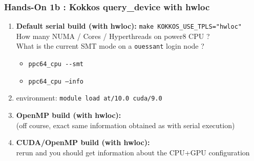 \begin{frame}[fragile=singleslide]
  \frametitle{Hands-On 1b : Kokkos query\_device with hwloc}

  \begin{enumerate}
  \item \textbf{Default serial build (with hwloc):} \texttt{make KOKKOS\_USE\_TPLS="hwloc"}\\
    How many NUMA / Cores / Hyperthreads on power8 CPU ?\\
    What is the current SMT mode on a \texttt{ouessant} login node ?
    \begin{itemize}
    \item \texttt{ppc64\_cpu \--\--smt}
    \item \texttt{ppc64\_cpu --info} 
    \end{itemize}
  \item environment: \texttt{module load at/10.0 cuda/9.0}
  \item \textbf{OpenMP build (with hwloc):}\\
     (off course, exact same information obtained as with serial execution)
  \item \textbf{CUDA/OpenMP build (with hwloc):}\\
     rerun and you should get information about the CPU+GPU configuration
  \end{enumerate}
  
\end{frame}

